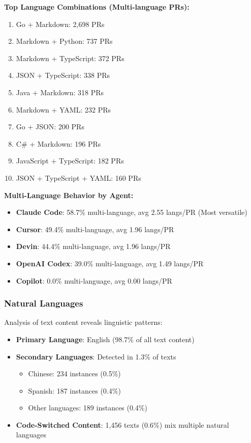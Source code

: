\documentclass[11pt]{article}
\begin{document}
\textbf{Top Language Combinations (Multi-language PRs):}
\begin{enumerate}
    \item Go + Markdown: 2,698 PRs
    \item Markdown + Python: 737 PRs  
    \item Markdown + TypeScript: 372 PRs
    \item JSON + TypeScript: 338 PRs
    \item Java + Markdown: 318 PRs
    \item Markdown + YAML: 232 PRs
    \item Go + JSON: 200 PRs
    \item C\# + Markdown: 196 PRs
    \item JavaScript + TypeScript: 182 PRs
    \item JSON + TypeScript + YAML: 160 PRs
\end{enumerate}

\textbf{Multi-Language Behavior by Agent:}
\begin{itemize}
    \item \textbf{Claude Code}: 58.7\% multi-language, avg 2.55 langs/PR (Most versatile)
    \item \textbf{Cursor}: 49.4\% multi-language, avg 1.96 langs/PR
    \item \textbf{Devin}: 44.4\% multi-language, avg 1.96 langs/PR
    \item \textbf{OpenAI Codex}: 39.0\% multi-language, avg 1.49 langs/PR
    \item \textbf{Copilot}: 0.0\% multi-language, avg 0.00 langs/PR
\end{itemize}

\subsubsection{Natural Languages}

Analysis of text content reveals linguistic patterns:
\begin{itemize}
    \item \textbf{Primary Language}: English (98.7\% of all text content)
    \item \textbf{Secondary Languages}: Detected in 1.3\% of texts
    \begin{itemize}
        \item Chinese: 234 instances (0.5\%)
        \item Spanish: 187 instances (0.4\%)
        \item Other languages: 189 instances (0.4\%)
    \end{itemize}
    \item \textbf{Code-Switched Content}: 1,456 texts (0.6\%) mix multiple natural languages
\end{itemize}
\end{document}
